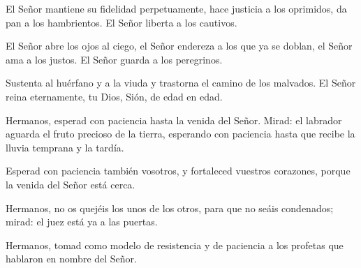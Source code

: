 
		 

		
		\begin{psbody}
			El Señor mantiene su fidelidad perpetuamente, 
			hace justicia a los oprimidos, 
			da pan a los hambrientos. 
			El Señor liberta a los cautivos. 
			
			El Señor abre los ojos al ciego, 
			el Señor endereza a los que ya se doblan, 
			el Señor ama a los justos. 
			El Señor guarda a los peregrinos. 
			
			Sustenta al huérfano y a la viuda 
			y trastorna el camino de los malvados. 
			El Señor reina eternamente, 
			tu Dios, Sión, de edad en edad.
		\end{psbody}


		 

		
		\begin{scripture}
			Hermanos, esperad con paciencia hasta la venida del Señor. Mirad: el labrador aguarda el fruto precioso de la tierra, esperando con paciencia hasta que recibe la lluvia temprana y la tardía. 
			
			Esperad con paciencia también vosotros, y fortaleced vuestros corazones, porque la venida del Señor está cerca. 
			
			Hermanos, no os quejéis los unos de los otros, para que no seáis condenados; mirad: el juez está ya a las puertas. 
			
			Hermanos, tomad como modelo de resistencia y de paciencia a los profetas que hablaron en nombre del Señor.
		\end{scripture}


		 

		
